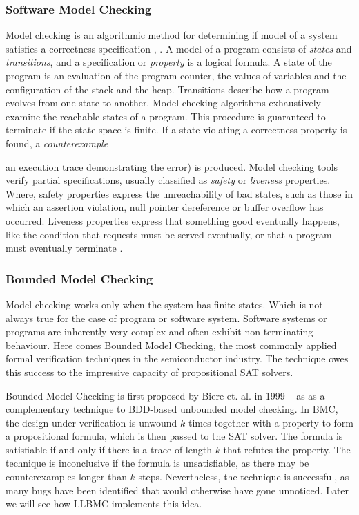 \documentclass[14pt]{article}
\begin{document}
\subsubsection*{Software Model Checking}\label{Software Model Checking}
Model checking is an algorithmic method for determining if model of a system satisfies a correctness specification \cite{MC1}, \cite{MC2}. A model of a program consists of \textit{states} and \textit{transitions}, and a specification or \textit{property} is a logical formula. A state of the program is an evaluation of the program counter, the values of variables and the configuration of the stack and the heap. Transitions describe how a program evolves from one state to another. Model checking algorithms exhaustively examine the reachable states of a program. This procedure is guaranteed to terminate if the state space is finite. If a state violating a correctness property is found, a \textit{counterexample}{ an execution trace demonstrating the error) is produced. Model checking tools verify partial specifications, usually classified as \textit{safety} or \textit{liveness} properties. Where, safety properties express the unreachability of bad states, such as those in which an assertion violation, null pointer dereference or buffer overflow has occurred. Liveness properties express that something good eventually happens, like the condition that requests must be served eventually, or that a program must eventually terminate \cite{MC3}.

\subsubsection*{Bounded Model Checking}\label{bounded model checking}
Model checking works only when the system has finite states. Which is not always true for the case of program or software system. Software systems or programs are inherently very complex and often exhibit non-terminating behaviour. Here comes Bounded Model Checking,  the most commonly applied formal verification techniques in the semiconductor industry. The technique owes this success to the impressive
capacity of propositional SAT solvers. 
					
Bounded Model Checking is first proposed by Biere et. al. in 1999 ~\cite{1} as as a complementary technique to BDD-based unbounded model checking. In BMC, the design under verification is unwound \(k\) times together with a property to form a propositional formula, which is then passed to the SAT solver.
The formula is satisfiable if and only if there is a trace of length \(k\) that refutes the property. The technique is inconclusive if the formula is unsatisfiable, as there may be counterexamples longer than \(k\) steps. Nevertheless, the technique is successful, as many bugs have been identified that would otherwise have gone unnoticed. Later we will see how LLBMC implements this idea.

}
\end{document}
